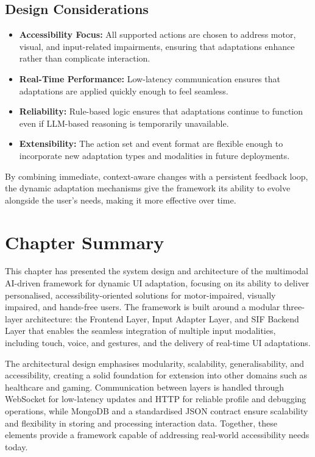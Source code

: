 \documentclass[openany]{book}
\begin{document}
\subsection{Design Considerations}
\begin{itemize}
    \item \textbf{Accessibility Focus:} All supported actions are chosen to address motor, visual, and input-related impairments, ensuring that adaptations enhance rather than complicate interaction.
    \item \textbf{Real-Time Performance:} Low-latency communication ensures that adaptations are applied quickly enough to feel seamless.
    \item \textbf{Reliability:} Rule-based logic ensures that adaptations continue to function even if LLM-based reasoning is temporarily unavailable.
    \item \textbf{Extensibility:} The action set and event format are flexible enough to incorporate new adaptation types and modalities in future deployments.
\end{itemize}
By combining immediate, context-aware changes with a persistent feedback loop, the dynamic adaptation mechanisms give the framework its ability to evolve alongside the user’s needs, making it more effective over time.

\section{Chapter Summary}
This chapter has presented the system design and architecture of the multimodal AI-driven framework for dynamic UI adaptation, focusing on its ability to deliver personalised, accessibility-oriented solutions for motor-impaired, visually impaired, and hands-free users. The framework is built around a modular three-layer architecture: the Frontend Layer, Input Adapter Layer, and SIF Backend Layer that enables the seamless integration of multiple input modalities, including touch, voice, and gestures, and the delivery of real-time UI adaptations.

The architectural design emphasises modularity, scalability, generalisability, and accessibility, creating a solid foundation for extension into other domains such as healthcare and gaming. Communication between layers is handled through WebSocket for low-latency updates and HTTP for reliable profile and debugging operations, while MongoDB and a standardised JSON contract ensure scalability and flexibility in storing and processing interaction data.
Together, these elements provide a framework capable of addressing real-world accessibility needs today.
\end{document}
